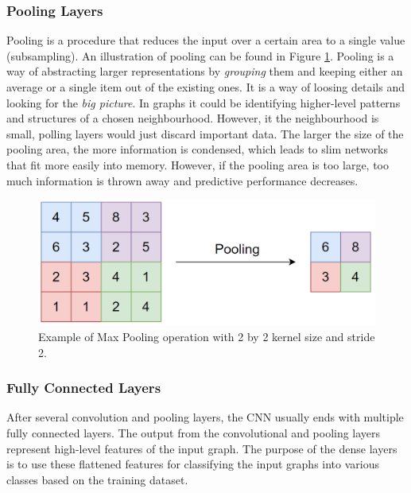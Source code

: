 \subsubsection*{Pooling Layers}

Pooling is a procedure that reduces the input over a certain area to a single value (subsampling). An illustration of pooling can be found in Figure \ref{Pooling}. Pooling is a way of abstracting larger representations by \textit{grouping} them and keeping either an average or a single item out of the existing ones. It is a way of loosing details and looking for the \textit{big picture}. In graphs it could be identifying higher-level patterns and structures of a chosen neighbourhood. However, it the neighbourhood is small, polling layers would just discard important data. The larger the size of the pooling area, the more information is condensed, which leads to slim networks that fit more easily into memory. However, if the pooling area is too large, too much information is thrown away and predictive performance decreases. 

\begin{figure}[H]
  \centering
  \includegraphics[scale=0.25]{Images/pooling.png}
  \caption{Example of Max Pooling operation with 2 by 2 kernel size and stride 2.}
  \label{Pooling}
\end{figure}

\subsubsection*{Fully Connected Layers}

After several convolution and pooling layers, the CNN usually ends with multiple fully connected layers. The output from the convolutional and pooling layers represent high-level features of the input graph. The purpose of the dense layers is to use these flattened features for classifying the input graphs into various classes based on the training dataset. \\

